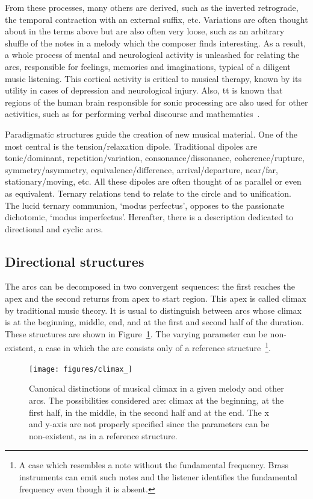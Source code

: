 From these processes, many others are derived, such as the inverted retrograde, the temporal contraction with an external suffix, etc. Variations are often thought about in the terms above but are also often very loose, such as an arbitrary shuffle of the notes in a melody which the composer finds interesting. As a result, a whole process of mental and neurological activity is unleashed for relating the arcs, responsible for feelings, memories and imaginations, typical of a diligent music listening. This cortical activity is critical to
musical therapy, known by its utility in cases of depression and neurological injury. Also, tt is known that regions of the human brain responsible for sonic processing are also used for other activities, such as for performing verbal discourse and mathematics~\cite{Sacks,Roederer}.

Paradigmatic structures guide the creation of new musical material.
One of the most central is the tension/relaxation dipole. Traditional dipoles are tonic/dominant, repetition/variation,
consonance/dissonance, coherence/rupture, symmetry/asymmetry,
equivalence/difference, arrival/departure, near/far, stationary/moving,
etc. All these dipoles are often thought of as parallel or even as equivalent. Ternary relations tend to relate to the circle and to unification. The
lucid ternary communion, `modus perfectus', opposes to the passionate
dichotomic, `modus imperfectus'. Hereafter, there is a description dedicated to
directional and cyclic arcs.

\subsection{Directional structures}\label{subsec:dir}
The arcs can be decomposed in two convergent sequences: the first reaches the apex and the second returns from apex to start region.
This apex is called climax by traditional music theory. It is
usual to distinguish between arcs whose climax is at the beginning, middle, end,
and at the first and second half of the duration. These structures are
shown in Figure~\ref{fig:climax}. The varying parameter can be non-existent, a case in which
the arc consists only of a reference structure~\cite{Schoenberg}\footnote{A case which resembles a note without the fundamental frequency. Brass instruments can emit such notes and the listener identifies the fundamental frequency even though it is absent.}.

\begin{figure}
    \centering
        \texttt{[image: figures/climax\_]}
        \caption{Canonical distinctions of musical climax in a given melody and
        other arcs. The possibilities considered are: climax at the beginning, at the first half, in the middle, in the second half and 
        at the end. The x and y-axis are not properly specified since the parameters can be non-existent, as in a reference structure.}
        \label{fig:climax}
\end{figure}

